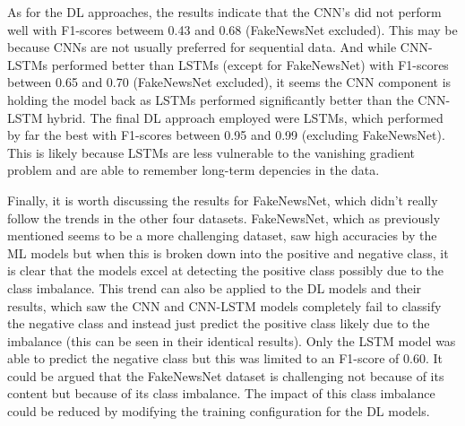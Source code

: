 \documentclass[stu,12pt,floatsintext,donotrepeattitle]{apa7}
\begin{document}
As for the DL approaches, the results indicate that the CNN's did not perform well with F1-scores betweem 0.43 and 0.68 (FakeNewsNet excluded). This may be because CNNs are not usually preferred for sequential data. And while CNN-LSTMs performed better than LSTMs (except for FakeNewsNet) with F1-scores between 0.65 and 0.70 (FakeNewsNet excluded), it seems the CNN component is holding the model back as LSTMs performed significantly better than the CNN-LSTM hybrid. The final DL approach employed were LSTMs, which performed by far the best with F1-scores between 0.95 and 0.99 (excluding FakeNewsNet). This is likely because LSTMs are less vulnerable to the vanishing gradient problem and are able to remember long-term depencies in the data. 

Finally, it is worth discussing the results for FakeNewsNet, which didn't really follow the trends in the other four datasets. FakeNewsNet, which as previously mentioned seems to be a more challenging dataset, saw high accuracies by the ML models but when this is broken down into the positive and negative class, it is clear that the models excel at detecting the positive class possibly due to the class imbalance. This trend can also be applied to the DL models and their results, which saw the CNN and CNN-LSTM models completely fail to classify the negative class and instead just predict the positive class likely due to the imbalance (this can be seen in their identical results). Only the LSTM model was able to predict the negative class but this was limited to an F1-score of 0.60. It could be argued that the FakeNewsNet dataset is challenging not because of its content but because of its class imbalance. The impact of this class imbalance could be reduced by modifying the training configuration for the DL models.
\end{document}
